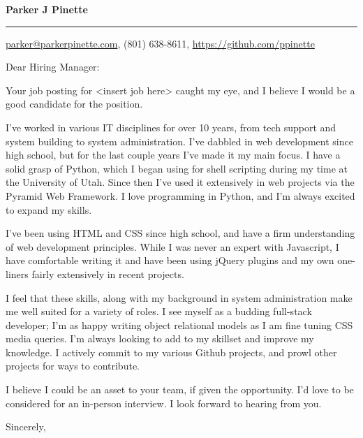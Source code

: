 \documentclass{letter}
\begin{document}
\signature{Parker J Pinette}
\longindentation=8pt
\let\raggedleft\raggedright
\headsep=20pt

\begin{letter}{}

\begin{flushleft}
 {\large\bf Parker J Pinette}
\end{flushleft}
\medskip\hrule height 1pt
\begin{flushright}
 \hfill \href{mailto:parker@parkerpinette.com}{parker@parkerpinette.com}, (801) 638-8611, \url{https://github.com/ppinette} 
\end{flushright}
\vfill

\opening{Dear Hiring Manager:}

\noindent Your job posting for <insert job here> caught my eye, and I believe I would be a good candidate for the position.  

\noindent I've worked in various IT disciplines for over 10 years, from tech support and system building to system administration. I've dabbled in web development since high school, but for the last couple years I've made it my main focus. I have a solid grasp of Python, which I began using for shell scripting during my time at the University of Utah. Since then I've used it extensively in web projects via the Pyramid Web Framework. I love programming in Python, and I'm always excited to expand my skills. 

\noindent I've been using HTML and CSS since high school, and have a firm understanding of web development principles. While I was never an expert with Javascript, I have comfortable writing it and have been using jQuery plugins and my own one-liners fairly extensively in recent projects. 

\noindent I feel that these skills, along with my background in system administration make me well suited for a variety of roles. I see myself as a budding full-stack developer; I'm as happy writing object relational models as I am fine tuning CSS media queries. I'm always looking to add to my skillset and improve my knowledge. I actively commit to my various Github projects, and prowl other projects for ways to contribute.

\noindent I believe I could be an asset to your team, if given the opportunity. I'd love to be considered for an in-person interview. I look forward to hearing from you.

\closing{Sincerely,}
\end{letter}
\end{document}
